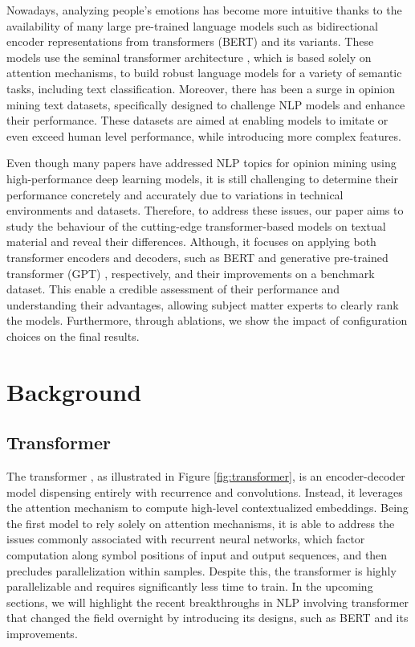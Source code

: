 \documentclass{article}
\begin{document}
Nowadays, analyzing people’s emotions has become more intuitive thanks to the availability of many large pre-trained language models such as bidirectional encoder representations from transformers (BERT) \cite{devlin2018bert} and its variants. These models use the seminal transformer architecture \cite{vaswani2017attention}, which is based solely on attention mechanisms, to build robust language models for a variety of semantic tasks, including text classification. Moreover, there has been a surge in opinion mining text datasets, specifically designed to challenge NLP models and enhance their performance. These datasets are aimed at enabling models to imitate or even exceed human level performance, while introducing more complex features.

Even though many papers have addressed NLP topics for opinion mining using high-performance deep learning models, it is still challenging to determine their performance concretely and accurately due to variations in technical environments and datasets. Therefore, to address these issues, our paper aims to study the behaviour of the cutting-edge transformer-based models on textual material and reveal their differences. Although, it focuses on applying both transformer encoders and decoders, such as BERT \cite{devlin2018bert} and generative pre-trained transformer (GPT) \cite{radford2018improving}, respectively, and their improvements on a benchmark dataset. This enable a credible assessment of their performance and understanding their advantages, allowing subject matter experts to clearly rank the models. Furthermore, through ablations, we show the impact of configuration choices on the final results.


\section{Background}
\label{}
\subsection{Transformer}
The transformer \cite{vaswani2017attention}, as illustrated in Figure \ref{fig:transformer}, is an encoder-decoder model dispensing entirely with recurrence and convolutions. Instead, it leverages the attention mechanism to compute high-level contextualized embeddings. Being the first model to rely solely on attention mechanisms, it is able to address the issues commonly associated with recurrent neural networks, which factor computation along symbol positions of input and output sequences, and then precludes parallelization within samples. Despite this, the transformer is highly parallelizable and requires significantly less time to train. In the upcoming sections, we will highlight the recent breakthroughs in NLP involving transformer that changed the field overnight by introducing its designs, such as BERT \cite{devlin2018bert} and its improvements.
\end{document}
